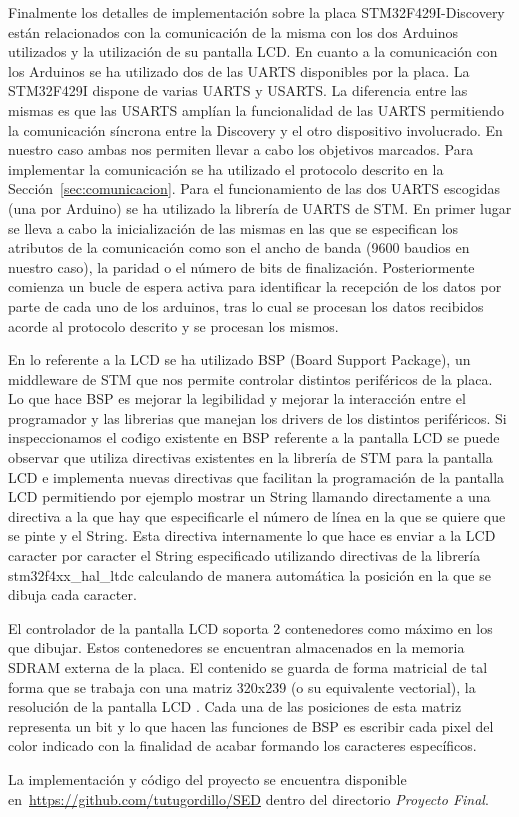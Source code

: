 Finalmente los detalles de implementaci\'on sobre la placa
STM32F429I-Discovery est\'an relacionados con la comunicaci\'on de la
misma con los dos Arduinos utilizados y la utilizaci\'on de su
pantalla LCD. En cuanto a la comunicaci\'on con los Arduinos se ha
utilizado dos de las UARTS disponibles por la placa. La STM32F429I
dispone de varias UARTS y USARTS. La diferencia entre las mismas es
que las USARTS ampl\'ian la funcionalidad de las UARTS permitiendo la
comunicaci\'on s\'incrona entre la Discovery y el otro dispositivo
involucrado. En nuestro caso ambas nos permiten
llevar a cabo los objetivos marcados. Para implementar la
comunicaci\'on se ha utilizado el protocolo descrito en la
Secci\'on~\ref{sec:comunicacion}. Para el funcionamiento de las dos
UARTS escogidas (una por Arduino) se ha utilizado la librer\'ia de UARTS
de STM. En primer lugar se lleva a cabo la inicializaci\'on de las
mismas en las que se especifican los atributos de la comunicaci\'on
como son el ancho de banda (9600 baudios en nuestro caso), la paridad
o el n\'umero de bits de finalizaci\'on. Posteriormente comienza un
bucle de espera activa para identificar la recepci\'on de los datos
por parte de cada uno de los arduinos, tras lo cual se procesan los
datos recibidos acorde al protocolo descrito y se procesan los mismos.

En lo referente a la LCD se ha utilizado BSP (Board Support Package),
un middleware de STM que nos permite controlar distintos perif\'ericos
de la placa. Lo que hace BSP es mejorar la legibilidad y mejorar la
interacci\'on entre el programador y las librerias que manejan los
drivers de los distintos perif\'ericos. Si inspeccionamos el co\'digo
existente en BSP referente a la pantalla LCD se puede observar
que utiliza directivas existentes en la librer\'ia de
STM para la pantalla LCD e implementa nuevas directivas que facilitan
la programaci\'on de la pantalla LCD permitiendo por ejemplo mostrar
un String llamando directamente a una directiva a la que hay que
especificarle el n\'umero de l\'inea en la que se quiere que se pinte
y el String. Esta directiva internamente lo que hace es enviar a la
LCD caracter por caracter el String especificado utilizando directivas
de la librer\'ia stm32f4xx\_hal\_ltdc calculando de manera autom\'atica la posici\'on en la
que se dibuja cada caracter.

El controlador de la pantalla LCD soporta 2 contenedores como m\'aximo
en los que dibujar. Estos contenedores se encuentran almacenados en la
memoria SDRAM externa de la placa. El contenido se guarda de forma
matricial de tal forma que se trabaja con una matriz 320x239 (o su
equivalente vectorial), la
resoluci\'on de la pantalla LCD . Cada una de las posiciones de esta
matriz representa un bit y lo que hacen las funciones de BSP es
escribir cada pixel del color indicado con la finalidad de acabar
formando los caracteres espec\'ificos.

La implementaci\'on y c\'odigo del proyecto se encuentra disponible en~\url{https://github.com/tutugordillo/SED} dentro del directorio
\emph{Proyecto Final}.  
